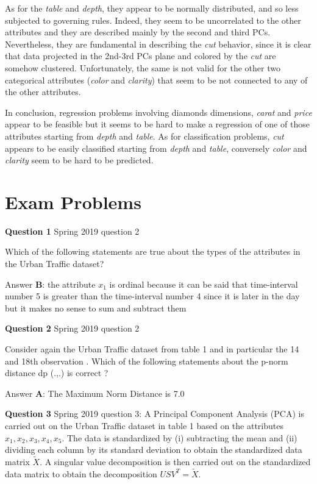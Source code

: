 \documentclass[
]{article}
\begin{document}
As for the \emph{table} and \emph{depth}, they appear to be normally
distributed, and so less subjected to governing rules. Indeed, they seem
to be uncorrelated to the other attributes and they are described mainly
by the second and third PCs. Nevertheless, they are fundamental in
describing the \emph{cut} behavior, since it is clear that data
projected in the 2nd-3rd PCs plane and colored by the \emph{cut} are
somehow clustered. Unfortunately, the same is not valid for the other
two categorical attributes (\emph{color} and \emph{clarity}) that seem
to be not connected to any of the other attributes.

In conclusion, regression problems involving diamonds dimensions,
\emph{carat} and \emph{price} appear to be feasible but it seems to be
hard to make a regression of one of those attributes starting from
\emph{depth} and \emph{table}. As for classification problems,
\emph{cut} appears to be easily classified starting from \emph{depth}
and \emph{table}, conversely \emph{color} and \emph{clarity} seem to be
hard to be predicted.

\newpage

\section{Exam Problems}\label{exam-problems}

\textbf{Question 1} \textbar{} Spring 2019 question 2

Which of the following statements are true about the types of the
attributes in the Urban Traffic dataset?

Answer \textbf{B}: the attribute \(x_1\) is ordinal because it can be
said that time-interval number 5 is greater than the time-interval
number 4 since it is later in the day but it makes no sense to sum and
subtract them

\textbf{Question 2} \textbar{} Spring 2019 question 2

Consider again the Urban Traffic dataset from table 1 and in particular
the 14 and 18th observation . Which of the following statements about
the p-norm distance dp (.,.) is correct ?

Answer \textbf{A}: The Maximum Norm Distance is 7.0

\textbf{Question 3} \textbar{} Spring 2019 question 3: A Principal
Component Analysis (PCA) is carried out on the Urban Traffic dataset in
table 1 based on the attributes \({x_1}, {x_2}, {x_3}, {x_4}, {x_5}\).
The data is standardized by (i) subtracting the mean and (ii) dividing
each column by its standard deviation to obtain the standardized data
matrix \(\tilde{X}\). A singular value decomposition is then carried out
on the standardized data matrix to obtain the decomposition
\(US{V^T} = {\tilde{X}}\).
\end{document}
